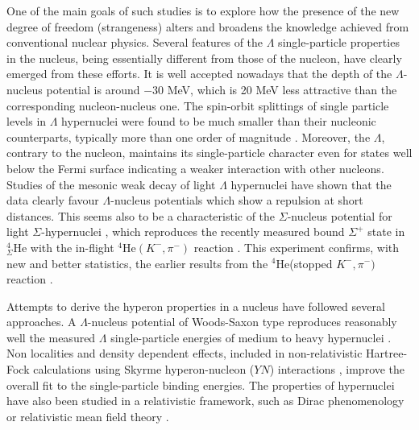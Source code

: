 One of the main goals of such studies is to explore how the presence
of the new degree of freedom (strangeness) alters and broadens the
knowledge achieved from 
conventional nuclear physics. Several features of the
$\Lambda$ single-particle properties in the nucleus, being 
essentially different from  those of the nucleon, have clearly
emerged from these efforts. It is well accepted nowadays that the
depth of the $\Lambda$-nucleus potential is around $-30$ MeV,
which is 20 MeV less attractive than the
corresponding nucleon-nucleus one. The spin-orbit splittings of single
particle levels in $\Lambda$ hypernuclei were found to be much smaller
than their nucleonic counterparts\cite{bruck78}, typically more
than one order of magnitude . Moreover,
the $\Lambda$, contrary to the nucleon, maintains its single-particle
character even for states well below the Fermi surface \cite{pile91,hase96} indicating
a weaker interaction with other nucleons. Studies of the mesonic weak
decay of light $\Lambda$ hypernuclei \cite{moto91,straub93,kuma95}
have shown that the data
\cite{szyman91} clearly favour $\Lambda$-nucleus potentials which
show a repulsion at short distances. This seems also to be a
characteristic of the $\Sigma$-nucleus potential for light
$\Sigma$-hypernuclei \cite{harada90}, which reproduces the
recently measured bound $\Sigma^+$ state in $^{4}_{\Sigma}$He with the
in-flight $^4$He$(K^-,\pi^-)$ reaction \cite{nagae98}. This experiment 
confirms, with new and better statistics, the earlier results from the
$^4$He(stopped $K^-,\pi^-)$ reaction \cite{hayano89}.

Attempts to derive the hyperon properties in a nucleus have followed
several approaches. A $\Lambda$-nucleus potential of Woods-Saxon type
reproduces reasonably well the measured $\Lambda$ single-particle
energies of medium to heavy hypernuclei
\cite{bouy76,dover80,moto88}.
Non localities and density dependent effects, included in
non-relativistic Hartree-Fock calculations using Skyrme
hyperon-nucleon ($YN$)
interactions \cite{yama88,mille88,fernan89,lansk97}, improve the
overall fit to the single-particle binding energies.  The properties
of hypernuclei have also been studied in a relativistic framework,
such as Dirac phenomenology \cite{brock81,chiap91} or
relativistic mean field theory
\cite{mares89,mares94,lomba95,glende93,inei96,suga94,ma96,yama85}.

